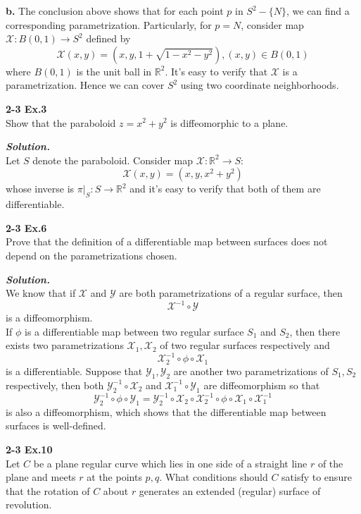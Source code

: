\documentclass{article}
\begin{document}
\textbf{b. }The conclusion above shows that for each point $p$ in $S^2 - \{N\}$, we can find
a corresponding parametrization. Particularly, for $p=N$, consider map $\mathcal{X}: B(0,1) \to S^2$ defined by
$$
    \mathcal{X}(x,y) = (x,y,1+\sqrt{1-x^2-y^2}), (x,y) \in B(0,1)
$$
where $B(0,1)$ is the unit ball in $\mathbb{R}^2$. It's easy to verify that $\mathcal{X}$ is a parametrization. Hence we can 
cover $S^2$ using two coordinate neighborhoods. \qedsymbol

\par
\textbf{2-3 Ex.3}\\
Show that the paraboloid $z = x^2 + y^2$ is diffeomorphic to a plane.

\par
\textbf{\textit{Solution.}}\\
Let $S$ denote the paraboloid. Consider map $\mathcal{X}: \mathbb{R}^2 \to S$:\\
$$
    \mathcal{X}(x,y) = (x,y,x^2+y^2)
$$
whose inverse is $\pi |_{S}: S \to \mathbb{R}^2$ and it's easy to verify that both of them are differentiable. \qedsymbol

\par
\textbf{2-3 Ex.6}\\
Prove that the definition of a differentiable map between surfaces does not depend on the parametrizations chosen.

\par
\textbf{\textit{Solution.}}\\
We know that if $\mathcal{X}$ and $\mathcal{Y}$ are both parametrizations of a regular surface, then
$$
    \mathcal{X}^{-1} \circ \mathcal{Y}
$$
is a diffeomorphism.\\
If $\phi$ is a differentiable map between two regular surface $S_1$ and $S_2$, then
there exists two parametrizations $\mathcal{X}_1, \mathcal{X}_2$ of two regular surfaces respectively and
$$
    \mathcal{X}_2^{-1} \circ \phi \circ \mathcal{X}_1
$$
is a differentiable. Suppose that $\mathcal{Y}_1, \mathcal{Y}_2$ are another two parametrizations of $S_1, S_2$ respectively,
then both $\mathcal{Y}_2^{-1} \circ \mathcal{X}_2$ and $\mathcal{X}_1^{-1} \circ \mathcal{Y}_1$ are diffeomorphism so that 
$$
    \mathcal{Y}_2^{-1} \circ \phi \circ \mathcal{Y}_1 = \mathcal{Y}_2^{-1} \circ \mathcal{X}_2 \circ \mathcal{X}_2^{-1} \circ \phi \circ \mathcal{X}_1 \circ \mathcal{X}_1^{-1}
$$
is also a diffeomorphism, which shows that the differentiable map between surfaces is well-defined. \qedsymbol

\par
\textbf{2-3 Ex.10}\\
Let $C$ be a plane regular curve which lies in one side of a straight line $r$ of the plane and meets $r$ at the points $p,q$.
What conditions should $C$ satisfy to ensure that the rotation of $C$ about $r$ generates an extended (regular) surface of revolution.
\end{document}
